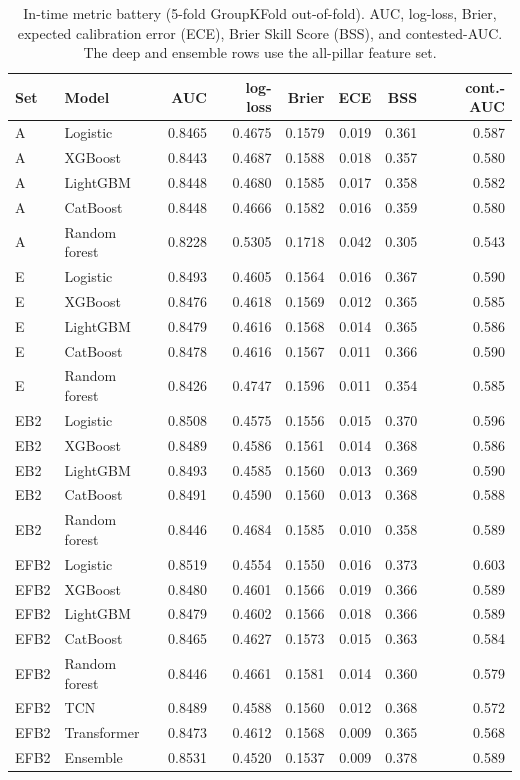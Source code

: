 \documentclass[11pt,a4paper]{article}
\begin{document}
\begin{table}[t]
\centering
\caption{In-time metric battery (5-fold GroupKFold out-of-fold). AUC, log-loss, Brier, expected
calibration error (ECE), Brier Skill Score (BSS), and contested-AUC. The deep and ensemble rows use
the all-pillar feature set.}
\label{tab:appB1}
\small
\begin{tabular}{llrrrrrr}
\toprule
Set & Model & AUC & log-loss & Brier & ECE & BSS & cont.-AUC \\
\midrule
A & Logistic & 0.8465 & 0.4675 & 0.1579 & 0.019 & 0.361 & 0.587 \\
A & XGBoost & 0.8443 & 0.4687 & 0.1588 & 0.018 & 0.357 & 0.580 \\
A & LightGBM & 0.8448 & 0.4680 & 0.1585 & 0.017 & 0.358 & 0.582 \\
A & CatBoost & 0.8448 & 0.4666 & 0.1582 & 0.016 & 0.359 & 0.580 \\
A & Random forest & 0.8228 & 0.5305 & 0.1718 & 0.042 & 0.305 & 0.543 \\
\midrule
E & Logistic & 0.8493 & 0.4605 & 0.1564 & 0.016 & 0.367 & 0.590 \\
E & XGBoost & 0.8476 & 0.4618 & 0.1569 & 0.012 & 0.365 & 0.585 \\
E & LightGBM & 0.8479 & 0.4616 & 0.1568 & 0.014 & 0.365 & 0.586 \\
E & CatBoost & 0.8478 & 0.4616 & 0.1567 & 0.011 & 0.366 & 0.590 \\
E & Random forest & 0.8426 & 0.4747 & 0.1596 & 0.011 & 0.354 & 0.585 \\
\midrule
EB2 & Logistic & 0.8508 & 0.4575 & 0.1556 & 0.015 & 0.370 & 0.596 \\
EB2 & XGBoost & 0.8489 & 0.4586 & 0.1561 & 0.014 & 0.368 & 0.586 \\
EB2 & LightGBM & 0.8493 & 0.4585 & 0.1560 & 0.013 & 0.369 & 0.590 \\
EB2 & CatBoost & 0.8491 & 0.4590 & 0.1560 & 0.013 & 0.368 & 0.588 \\
EB2 & Random forest & 0.8446 & 0.4684 & 0.1585 & 0.010 & 0.358 & 0.589 \\
\midrule
EFB2 & Logistic & 0.8519 & 0.4554 & 0.1550 & 0.016 & 0.373 & 0.603 \\
EFB2 & XGBoost & 0.8480 & 0.4601 & 0.1566 & 0.019 & 0.366 & 0.589 \\
EFB2 & LightGBM & 0.8479 & 0.4602 & 0.1566 & 0.018 & 0.366 & 0.589 \\
EFB2 & CatBoost & 0.8465 & 0.4627 & 0.1573 & 0.015 & 0.363 & 0.584 \\
EFB2 & Random forest & 0.8446 & 0.4661 & 0.1581 & 0.014 & 0.360 & 0.579 \\
\midrule
EFB2 & TCN & 0.8489 & 0.4588 & 0.1560 & 0.012 & 0.368 & 0.572 \\
EFB2 & Transformer & 0.8473 & 0.4612 & 0.1568 & 0.009 & 0.365 & 0.568 \\
EFB2 & Ensemble & 0.8531 & 0.4520 & 0.1537 & 0.009 & 0.378 & 0.589 \\
\bottomrule
\end{tabular}
\end{table}
\end{document}
